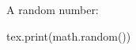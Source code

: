 \documentclass{article}
\begin{document}
A random number:
\begin{luacode}
  tex.print(math.random())
\end{luacode}
\end{document}
